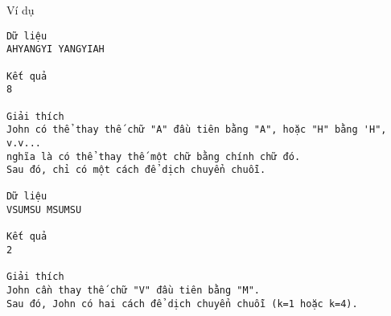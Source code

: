 Ví dụ
\begin{verbatim}
Dữ liệu
AHYANGYI YANGYIAH

Kết quả
8

Giải thích
John có thể thay thế chữ "A" đầu tiên bằng "A", hoặc "H" bằng 'H", v.v...
nghĩa là có thể thay thế một chữ bằng chính chữ đó.
Sau đó, chỉ có một cách để dịch chuyển chuỗi.

Dữ liệu
VSUMSU MSUMSU

Kết quả
2

Giải thích
John cần thay thế chữ "V" đầu tiên bằng "M".
Sau đó, John có hai cách để dịch chuyển chuỗi (k=1 hoặc k=4).
\end{verbatim}